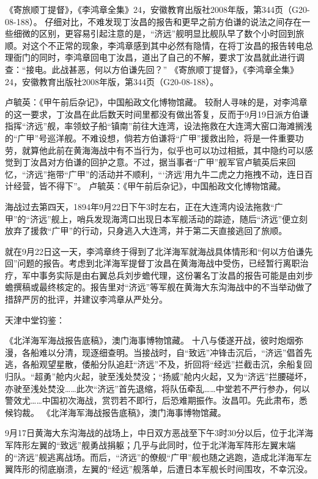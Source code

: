 \documentclass[12pt,UTF8]{ctexbook}
\begin{document}
《寄旅顺丁提督》，《李鸿章全集》24，安徽教育出版社2008年版，第344页（G20-08-188）。
仔细对比，不难发现丁汝昌的报告和更早之前方伯谦的说法之间存在一些细微的区别，更容易引起注意的是，“济远”舰明显比舰队早了数个小时回到旅顺。对这个不正常的现象，李鸿章感到其中必然有隐情，在将丁汝昌的报告转电总理衙门的同时，李鸿章回电丁汝昌，道出了自己的不解，要求丁汝昌就此进行调查：“接电。此战甚恶，何以方伯谦先回？” 《寄旅顺丁提督》，《李鸿章全集》24，安徽教育出版社2008年版，第344页（G20-08-188）。

卢毓英：《甲午前后杂记》，中国船政文化博物馆藏。
较耐人寻味的是，对李鸿章的这一要求，丁汝昌在此后数天时间里都没有做出答复，反而于9月19日派方伯谦指挥“济远”舰，率领蚊子船“镇南”前往大连湾，设法拖救在大连湾大窑口海滩搁浅的“广甲”号巡洋舰。不难设想，倘若方伯谦将“广甲”援救出险，将是一件重要功劳，就算他此前在黄海海战中有不当行为，似乎也可以功过相抵，其中隐约可以感觉到丁汝昌对方伯谦的回护之意。不过，据当事者“广甲”舰军官卢毓英后来回忆，“济远”拖带“广甲”的活动并不顺利，“‘济远’用九牛二虎之力拖拽不动，连日百计经营，皆不得下”。 卢毓英：《甲午前后杂记》，中国船政文化博物馆藏。

海战过去第四天，1894年9月22日下午3时左右，正在大连湾内设法拖救“广甲”的“济远”舰上，哨兵发现海湾口出现日本军舰活动的踪迹，随后“济远”便立刻放弃了援救“广甲”的行动，只身逃入大连湾，并于第二天直接逃回了旅顺。

就在9月22日这一天，李鸿章终于得到了北洋海军就海战具体情形和“何以方伯谦先回”问题的报告。考虑到北洋海军提督丁汝昌在黄海海战中受伤，已经暂行离职治疗，军中事务实际是由右翼总兵刘步蟾代理，这份署名丁汝昌的报告可能是由刘步蟾撰稿或最终核定的。报告里对“济远”等军舰在黄海大东沟海战中的不当举动做了措辞严厉的批评，并建议李鸿章从严处分。

天津中堂钧鉴：

《北洋海军海战报告底稿》，澳门海事博物馆藏。
十八与倭遂开战，彼时炮烟弥漫，各船难以分清，现逐细查明。当接战时，自“致远”冲锋击沉后，“济远”倡首先逃，各船观望星散，倭船分队追赶“济远”不及，折回将“经远”拦截击沉，余船复回归队。“超勇”舱内火起，驶至浅处焚没；“扬威”舱内火起，又为“济远”拦腰碰坏，亦驶至浅处焚没……此次“济远”首先退缩，将队伍牵乱……中堂若不严行参办，何以警效尤……中国初次海战，赏罚若不即行，后恐难期振作。汝昌叩。先此肃布，悉候钧裁。 《北洋海军海战报告底稿》，澳门海事博物馆藏。

9月17日黄海大东沟海战的战场上，中日双方恶战至下午3时30分以后，位于北洋海军阵形左翼的“致远”舰勇战捐躯；几乎与此同时，位于北洋海军阵形左翼末端的“济远”舰逃离战场。而后，“济远”的僚舰“广甲”舰也随之逃跑，造成北洋海军左翼阵形的彻底崩溃，左翼的“经远”舰落单，后遭日本军舰长时间围攻，不幸沉没。
\end{document}
